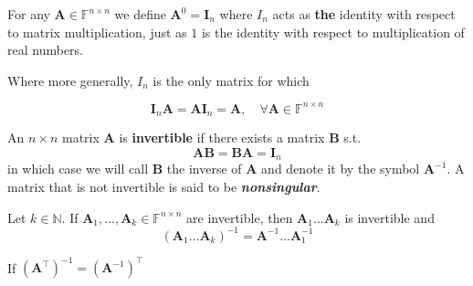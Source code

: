 \documentclass{article}
\begin{document}
\begin{definition}
    For any $\mathbf{A} \in \mathbb{F}^{n\times n}$ we define $\mathbf{A}^{0} = \mathbf{I}_n$ where $I_n$ acts as \textbf{the} identity with respect to matrix multiplication, just as $1$ is the identity with respect to multiplication of real numbers.    
\end{definition}

Where more generally, $I_n$ is the only matrix for which

\begin{equation}
    \mathbf{I}_n \mathbf{A} = \mathbf{A} \mathbf{I}_n = \mathbf{A}, \quad \forall \mathbf{A} \in \mathbb{F}^{n \times n}
\end{equation}

\begin{definition}
    An $n\times n$ matrix $\mathbf{A}$ is \textbf{invertible} if there exists a matrix $\mathbf{B}$ s.t. 
    \begin{equation*}
        \mathbf{AB} = \mathbf{BA} = \mathbf{I}_n 
    \end{equation*}
    in which case we will call $\mathbf{B}$ the inverse of $\mathbf{A}$ and denote it by the symbol $\mathbf{A}^{-1}$. A matrix that is not invertible is said to be \textbf{\textit{nonsingular}}. 
\end{definition}

\begin{theorem}
    Let $k \in \mathbb{N}$. If $\mathbf{A}_1,\dots, \mathbf{A}_k \in \mathbb{F}^{n\times n}$ are invertible, then $\mathbf{A}_1\dots \mathbf{A}_k$ is invertible and 
    \begin{equation*}
        (\mathbf{A}_{1}\dots \mathbf{A}_k)^{-1} = \mathbf{A}^{-1}\dots \mathbf{A}_{1}^{-1}
    \end{equation*}
\end{theorem}

\begin{proposition}
    If $(\mathbf{A}^\top)^{-1} = (\mathbf{A}^{-1})^\top$
\end{proposition}
\end{document}
